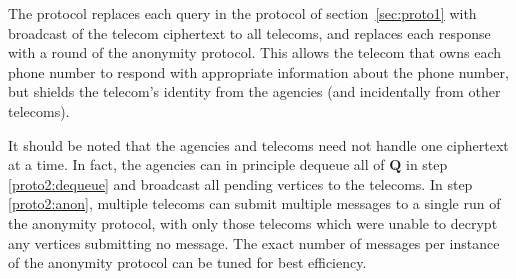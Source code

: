 The protocol replaces each query in the protocol of section~\ref{sec:proto1} with broadcast of the telecom ciphertext to all telecoms, and replaces each response with a round of the anonymity protocol. This allows the telecom that owns each phone number to respond with appropriate information about the phone number, but shields the telecom's identity from the agencies (and incidentally from other telecoms).

It should be noted that the agencies and telecoms need not handle one ciphertext at a time. In fact, the agencies can in principle dequeue all of $\mathbf{Q}$ in step \ref{proto2:dequeue} and broadcast all pending vertices to the telecoms. In step \ref{proto2:anon}, multiple telecoms can submit multiple messages to a single run of the anonymity protocol, with only those telecoms which were unable to decrypt any vertices submitting no message. The exact number of messages per instance of the anonymity protocol can be tuned for best efficiency.